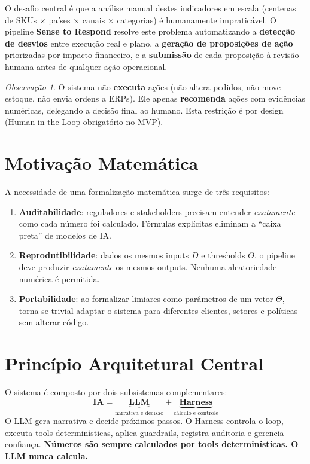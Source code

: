 \documentclass[a4paper, 12pt]{report}
\theoremstyle{definition}
\theoremstyle{remark}
\newtheorem{observacao}{Observa\c{c}\~ao}[chapter]
\begin{document}
O desafio central \'e que a an\'alise manual destes indicadores em escala
(centenas de SKUs $\times$ pa\'ises $\times$ canais $\times$ categorias)
\'e humanamente impratic\'avel. O pipeline \textbf{Sense to Respond} resolve
este problema automatizando a \textbf{detec\c{c}\~ao de desvios} entre
execu\c{c}\~ao real e plano, a \textbf{gera\c{c}\~ao de proposi\c{c}\~oes de a\c{c}\~ao}
priorizadas por impacto financeiro, e a \textbf{submiss\~ao} de cada
proposi\c{c}\~ao \`a revis\~ao humana antes de qualquer a\c{c}\~ao operacional.

\begin{observacao}
  O sistema n\~ao \textbf{executa} a\c{c}\~oes (n\~ao altera pedidos, n\~ao move
  estoque, n\~ao envia ordens a ERPs). Ele apenas \textbf{recomenda} a\c{c}\~oes
  com evid\^encias num\'ericas, delegando a decis\~ao final ao humano.
  Esta restri\c{c}\~ao \'e por design (Human-in-the-Loop obrigat\'orio no MVP).
\end{observacao}


\section{Motiva\c{c}\~ao Matem\'atica}

A necessidade de uma formaliza\c{c}\~ao matem\'atica surge de tr\^es requisitos:

\begin{enumerate}
  \item \textbf{Auditabilidade}: reguladores e stakeholders precisam
    entender \textit{exatamente} como cada n\'umero foi calculado.
    F\'ormulas expl\'icitas eliminam a ``caixa preta'' de modelos de IA.
  \item \textbf{Reprodutibilidade}: dados os mesmos inputs $D$ e
    thresholds $\Theta$, o pipeline deve produzir \textit{exatamente}
    os mesmos outputs. Nenhuma aleatoriedade num\'erica \'e permitida.
  \item \textbf{Portabilidade}: ao formalizar limiares como par\^ametros
    de um vetor $\Theta$, torna-se trivial adaptar o sistema para
    diferentes clientes, setores e pol\'iticas sem alterar c\'odigo.
\end{enumerate}


\section{Princ\'ipio Arquitetural Central}

\begin{caixadecisao}
  O sistema \'e composto por dois subsistemas complementares:
  \[
    \textbf{IA} = \underbrace{\textbf{LLM}}_{\text{narrativa e decis\~ao}}
    + \underbrace{\textbf{Harness}}_{\text{c\'alculo e controle}}
  \]
  O LLM gera narrativa e decide pr\'oximos passos.
  O Harness controla o loop, executa tools determin\'isticas,
  aplica guardrails, registra auditoria e gerencia confian\c{c}a.
  \textbf{N\'umeros s\~ao sempre calculados por tools determin\'isticas.
  O LLM nunca calcula.}
\end{caixadecisao}
\end{document}
